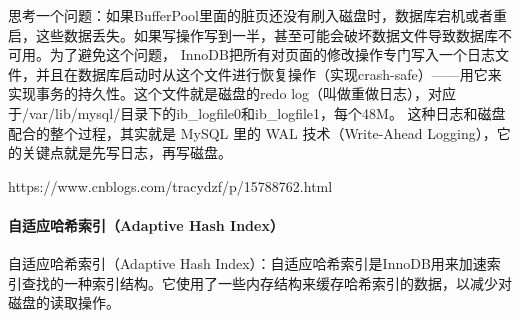 \documentclass[../../../interview-questions.tex]{subfiles}
\begin{document}
思考一个问题：如果BufferPool里面的脏页还没有刷入磁盘时，数据库宕机或者重启，这些数据丢失。如果写操作写到一半，甚至可能会破坏数据文件导致数据库不可用。为了避免这个问题， InnoDB把所有对页面的修改操作专门写入一个日志文件，并且在数据库启动时从这个文件进行恢复操作（实现crash-safe）——用它来实现事务的持久性。这个文件就是磁盘的redo log（叫做重做日志），对应于/var/lib/mysql/目录下的ib\_logfile0和ib\_logfile1，每个48M。 这种日志和磁盘配合的整个过程，其实就是 MySQL 里的 WAL 技术（Write-Ahead Logging），它的关键点就是先写日志，再写磁盘。

https://www.cnblogs.com/tracydzf/p/15788762.html

\paragraph{自适应哈希索引（Adaptive Hash Index）}

自适应哈希索引（Adaptive Hash Index）：自适应哈希索引是InnoDB用来加速索引查找的一种索引结构。它使用了一些内存结构来缓存哈希索引的数据，以减少对磁盘的读取操作。
\end{document}
